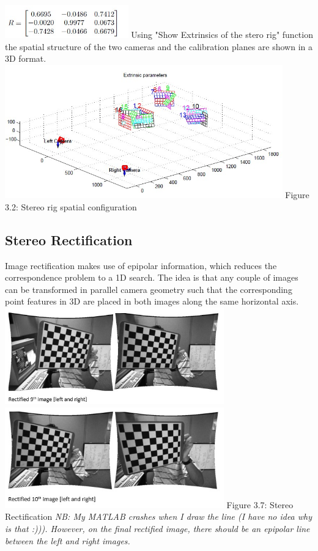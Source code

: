 \documentclass[a4paper, 12pt]{report}
\begin{document}
\includegraphics[width=0.4\textwidth]{resources/image/30.jpg} \newline 
Using "Show Extrinsics of the stero rig" function the spatial structure of the two cameras and the calibration planes are shown in a 3D format. \newline
\includegraphics[width=0.9\textwidth]{resources/image/str.jpg} \newline 
Figure 3.2: Stereo rig spatial configuration \newline 
\subsection{Stereo Rectification}
Image rectification makes use of epipolar information, which reduces the correspondence problem to a 1D search. The idea is that any couple of images can be transformed in parallel camera geometry such that the corresponding point features in 3D are placed in both images along the same horizontal axis. \newline 
\includegraphics[width=0.71\textwidth]{resources/image/60.jpg}  \newline
\includegraphics[width=0.71\textwidth]{resources/image/61.jpg} \newline 
Figure 3.7: Stereo Rectification \newline \newline 
\textit{NB: My MATLAB crashes when I draw the line (I have no idea why is that :))). However, on the final rectified image, there should be an epipolar line between the left and right images.}\newpage
\end{document}
